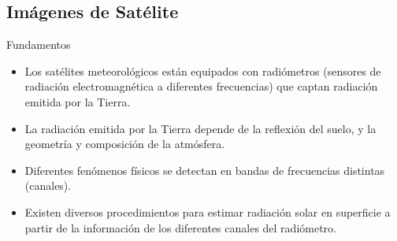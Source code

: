 \documentclass[xcolor={usenames,svgnames,dvipsnames}]{beamer}
\begin{document}
\subsection{Imágenes de Satélite}
\label{sec-6-4}

\begin{frame}[label=sec-6-4-1]{Fundamentos}
\begin{itemize}
\item Los satélites meteorológicos están equipados con \alert{radiómetros}
(sensores de radiación electromagnética a diferentes frecuencias)
que captan \alert{radiación emitida por la Tierra}.

\item La radiación emitida por la Tierra depende de la \alert{reflexión del
suelo}, y la \alert{geometría y composición de la atmósfera}.

\item Diferentes fenómenos físicos se detectan en \alert{bandas de frecuencias}
  distintas (canales).

\item Existen diversos procedimientos para \alert{estimar radiación solar} en
superficie a partir de la información de los diferentes canales del
radiómetro.
\end{itemize}
\end{frame}
\end{document}
